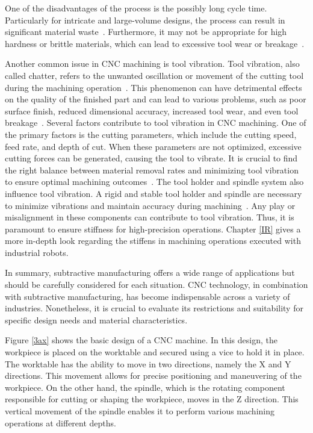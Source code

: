 One of the disadvantages of the process is the possibly long cycle time. Particularly for intricate and large-volume designs, the process can result in significant material waste~\cite{Faludi.2015}. Furthermore, it may not be appropriate for high hardness or brittle materials, which can lead to excessive tool wear or breakage~\cite{Hesser.2019}. 

Another common issue in CNC machining is tool vibration. Tool vibration, also called chatter, refers to the unwanted oscillation or movement of the cutting tool during the machining operation~\cite{YUE.2019}. This phenomenon can have detrimental effects on the quality of the finished part and can lead to various problems, such as poor surface finish, reduced dimensional accuracy, increased tool wear, and even tool breakage~\cite{Aslan.2018}. Several factors contribute to tool vibration in CNC machining. One of the primary factors is the cutting parameters, which include the cutting speed, feed rate, and depth of cut. When these parameters are not optimized, excessive cutting forces can be generated, causing the tool to vibrate. It is crucial to find the right balance between material removal rates and minimizing tool vibration to ensure optimal machining outcomes~\cite{GiorgioBort.2016}.
The tool holder and spindle system also influence tool vibration. A rigid and stable tool holder and spindle are necessary to minimize vibrations and maintain accuracy during machining~\cite{Wan.2019}. Any play or misalignment in these components can contribute to tool vibration. %
Thus, it is paramount to ensure stiffness for high-precision operations.
Chapter \ref{IR} gives a more in-depth look regarding the stiffens in machining operations executed with industrial robots.

In summary, subtractive manufacturing offers a wide range of applications but should be carefully considered for each situation. CNC technology, in combination with subtractive manufacturing, has become indispensable across a variety of industries. Nonetheless, it is crucial to evaluate its restrictions and suitability for specific design needs and material characteristics.

Figure \ref{3ax} shows the basic design of a CNC machine. In this design, the workpiece is placed on the worktable and secured using a vice to hold it in place. The worktable has the ability to move in two directions, namely the X and Y directions. This movement allows for precise positioning and maneuvering of the workpiece. On the other hand, the spindle, which is the rotating component responsible for cutting or shaping the workpiece, moves in the Z direction. This vertical movement of the spindle enables it to perform various machining operations at different depths.



